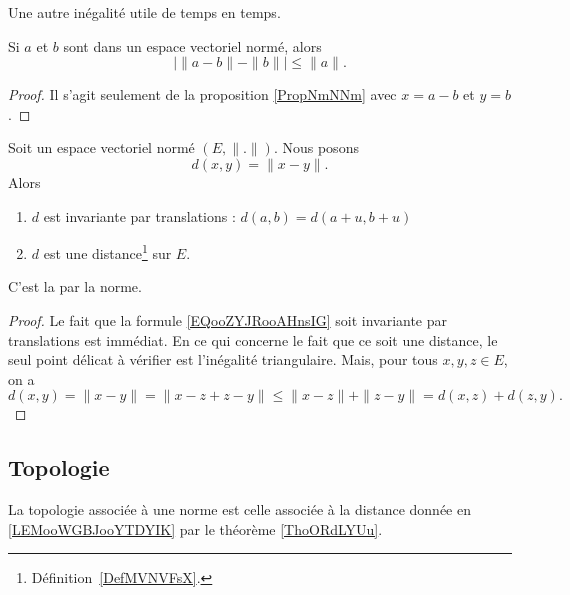 Une autre inégalité utile de temps en temps.
\begin{corollary}       \label{CORooDFBGooAqVRfS}
	Si \( a\) et \( b\) sont dans un espace vectoriel normé, alors
	\begin{equation}
		\big| \| a-b \|-\| b \| \big|\leq \| a \|.
	\end{equation}
\end{corollary}

\begin{proof}
	Il s'agit seulement de la proposition \ref{PropNmNNm} avec \( x=a-b\) et \( y=b\).
\end{proof}

\begin{lemmaDef}        \label{LEMooWGBJooYTDYIK}
	Soit un espace vectoriel normé \( (E,\| . \|)\). Nous posons
	\begin{equation}        \label{EQooZYJRooAHnsIG}
		d(x,y)=\| x-y \| .
	\end{equation}
	Alors
	\begin{enumerate}
		\item       \label{ITEMooLITDooPeReOk}
		      \( d\) est invariante par translations : \( d(a,b)=d(a+u,b+u)\)
		\item
		      \( d\) est une distance\footnote{Définition~\ref{DefMVNVFsX}.} sur \( E\).
	\end{enumerate}
	C'est la  par la norme.
\end{lemmaDef}

\begin{proof}
	Le fait que la formule \eqref{EQooZYJRooAHnsIG} soit invariante par translations est immédiat. En ce qui concerne le fait que ce soit une distance, le seul point délicat à vérifier est l'inégalité triangulaire. Mais, pour tous \( x, y, z \in E\), on a
	\begin{equation}
		d(x,y)=\| x-y \| = \| x-z+z-y \|  \leq\| x - z \|+\| z - y\| =d(x,z)+d(z,y).
	\end{equation}
\end{proof}

\subsection{Topologie}

\begin{definition}      \label{DEFooPMVFooPSYVNQ}
	La topologie associée à une norme est celle associée à la distance donnée en \ref{LEMooWGBJooYTDYIK} par le théorème \ref{ThoORdLYUu}.
\end{definition}
